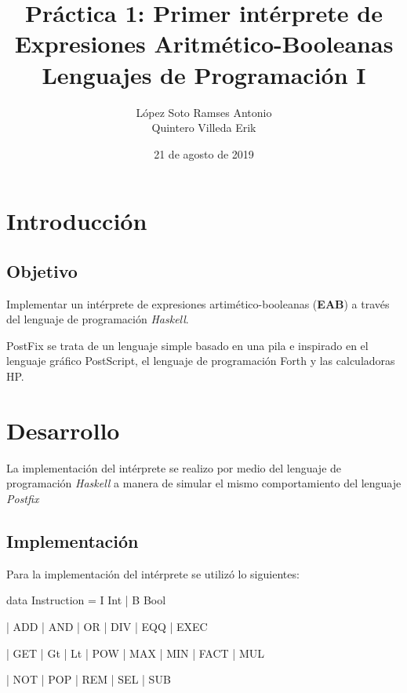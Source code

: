 \documentclass[12pt, letterpaper]{article}
\author{López Soto Ramses Antonio \\
        Quintero Villeda Erik}
\title{Práctica 1: Primer intérprete de Expresiones Aritmético-Booleanas \\
       {\small Lenguajes de Programación I}}
\date{21 de agosto de 2019}
\begin{document}
\maketitle

  \section*{Introducción}

  \subsection*{Objetivo}
  Implementar un intérprete de expresiones artimético-booleanas (\textbf{EAB})
  a través del lenguaje de programación \textit{Haskell}.\vspace{.3cm}

  PostFix se trata de un lenguaje simple basado en una pila e inspirado en el
  lenguaje gráfico PostScript, el lenguaje de programación Forth y las
  calculadoras HP.

  \section*{Desarrollo}
  La implementación del intérprete se realizo por medio del lenguaje de
  programación \textit{Haskell} a manera de simular el mismo comportamiento del
  lenguaje \textit{Postfix}

  \subsection*{Implementación}
  Para la implementación del intérprete se utilizó lo siguientes:\vspace{.2cm}


  \hspace{.5cm} data Instruction = I Int | B Bool \vspace{.1cm}

  \hspace{4cm}                  | ADD | AND | OR | DIV | EQQ | EXEC \vspace{.1cm}

  \hspace{4cm}                  | GET | Gt | Lt | POW | MAX | MIN | FACT | MUL \vspace{.1cm}

  \hspace{4cm}                  | NOT | POP | REM | SEL | SUB \vspace{.1cm}
\end{document}
